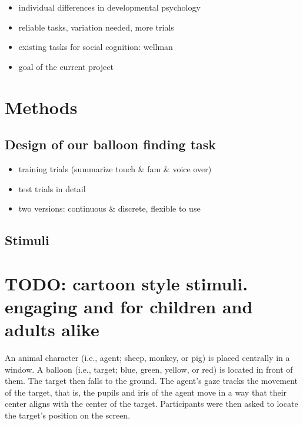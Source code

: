 \documentclass[
  english,
  man,floatsintext]{apa6}
\providecommand{\tightlist}{%
  \setlength{\itemsep}{0pt}\setlength{\parskip}{0pt}}
\begin{document}
\begin{itemize}
\tightlist
\item
  individual differences in developmental psychology
\item
  reliable tasks, variation needed, more trials
\item
  existing tasks for social cognition: wellman
\item
  goal of the current project
\end{itemize}

\hypertarget{methods}{%
\section{Methods}\label{methods}}

\hypertarget{design-of-our-balloon-finding-task}{%
\subsection{Design of our balloon finding task}\label{design-of-our-balloon-finding-task}}

\begin{itemize}
\tightlist
\item
  training trials (summarize touch \& fam \& voice over)
\item
  test trials in detail
\item
  two versions: continuous \& discrete, flexible to use
\end{itemize}

\hypertarget{stimuli}{%
\subsection{Stimuli}\label{stimuli}}

\hypertarget{todo-cartoon-style-stimuli.-engaging-and-for-children-and-adults-alike}{%
\section{TODO: cartoon style stimuli. engaging and for children and adults alike}\label{todo-cartoon-style-stimuli.-engaging-and-for-children-and-adults-alike}}

An animal character (i.e., agent; sheep, monkey, or pig) is placed centrally in a window. A balloon (i.e., target; blue, green, yellow, or red) is located in front of them. The target then falls to the ground. The agent's gaze tracks the movement of the target, that is, the pupils and iris of the agent move in a way that their center aligns with the center of the target. Participants were then asked to locate the target's position on the screen.
\end{document}
